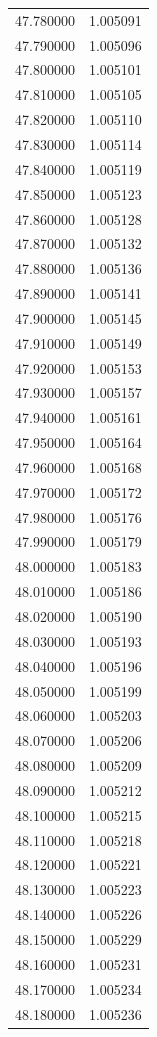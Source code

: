 \begin{tabular}{rr}
47.780000 & 1.005091 \\
47.790000 & 1.005096 \\
47.800000 & 1.005101 \\
47.810000 & 1.005105 \\
47.820000 & 1.005110 \\
47.830000 & 1.005114 \\
47.840000 & 1.005119 \\
47.850000 & 1.005123 \\
47.860000 & 1.005128 \\
47.870000 & 1.005132 \\
47.880000 & 1.005136 \\
47.890000 & 1.005141 \\
47.900000 & 1.005145 \\
47.910000 & 1.005149 \\
47.920000 & 1.005153 \\
47.930000 & 1.005157 \\
47.940000 & 1.005161 \\
47.950000 & 1.005164 \\
47.960000 & 1.005168 \\
47.970000 & 1.005172 \\
47.980000 & 1.005176 \\
47.990000 & 1.005179 \\
48.000000 & 1.005183 \\
48.010000 & 1.005186 \\
48.020000 & 1.005190 \\
48.030000 & 1.005193 \\
48.040000 & 1.005196 \\
48.050000 & 1.005199 \\
48.060000 & 1.005203 \\
48.070000 & 1.005206 \\
48.080000 & 1.005209 \\
48.090000 & 1.005212 \\
48.100000 & 1.005215 \\
48.110000 & 1.005218 \\
48.120000 & 1.005221 \\
48.130000 & 1.005223 \\
48.140000 & 1.005226 \\
48.150000 & 1.005229 \\
48.160000 & 1.005231 \\
48.170000 & 1.005234 \\
48.180000 & 1.005236 \\

\end{tabular}
